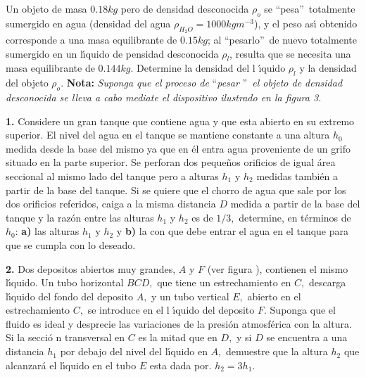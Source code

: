 \documentclass{article}
\begin{document}
\bigskip 

 Un objeto de masa $0.18kg$ pero de densidad desconocida $%
\rho _{o}$ se \textquotedblleft pesa\textquotedblright\ totalmente sumergido
en agua (densidad del agua $\rho _{H_{2}O}=1000kgm^{-3}$), y el peso as\'{\i}
obtenido corresponde a una masa equilibrante de $0.15kg$; al
\textquotedblleft pesarlo\textquotedblright\ de nuevo totalmente sumergido
en un l\'{\i}quido de pensidad desconocida $\rho _{l}$, resulta que se
necesita una masa equilibrante de $0.144kg.$ Determine la densidad del l%
\'{\i}quido $\rho _{l}$ y la densidad del objeto $\rho _{o}.$ \textbf{Nota: }%
\emph{Suponga que el proceso de }\textquotedblleft \emph{pesar}%
\textquotedblright \emph{\ el objeto de densidad desconocida se lleva a cabo
mediate el dispositivo ilustrado en la figura 3.}

\bigskip 

\bigskip 

\bigskip 

\textbf{1.} Considere un gran tanque que contiene agua y que esta abierto en
su extremo superior. El nivel del agua en el tanque se mantiene constante a
una altura $h_{0}$ medida desde la base del mismo ya que en \'{e}l entra
agua proveniente de un grifo situado en la parte superior. Se perforan dos
peque\~{n}os orificios de igual \'{a}rea seccional al mismo lado del tanque
pero a alturas $h_{1}$ y $h_{2}$ medidas tambi\'{e}n a partir de la base del
tanque. Si se quiere que el chorro de agua que sale por los dos orificios
referidos, caiga a la misma distancia $D$ medida a partir de la base del
tanque y la raz\'{o}n entre las alturas $h_{1}$ y $h_{2}$ es de $1/3,$
determine, en t\'{e}rminos de $h_{0}$: \textbf{a) }las alturas $h_{1}$ y $%
h_{2}$ y \textbf{b) }la con que debe entrar el agua en el tanque para que se
cumpla con lo deseado.

\bigskip

\textbf{2. }Dos depositos abiertos muy grandes, $A$ y $F$ (ver figura ),
contienen el mismo l\'{\i}quido. Un tubo horizontal $BCD,$ que tiene un
estrechamiento en $C,$ descarga l\'{\i}quido del fondo del deposito $A,$ y
un tubo vertical $E,$ abierto en el estrechamiento $C,$ se introduce en el l%
\'{\i}quido del deposito $F.$ Suponga que el fluido es ideal y desprecie las
variaciones de la presi\'{o}n atmosf\'{e}rica con la altura. Si la secci\'{o}%
n transversal en $C$ es la mitad que en $D,$ y si $D$ se encuentra a una
distancia $h_{1}$ por debajo del nivel del l\'{\i}quido en $A,$ demuestre
que la altura $h_{2}$ que alcanzar\'{a} el l\'{\i}quido en el tubo $E$ esta
dada por. $h_{2}=3h_{1}.$
\end{document}

